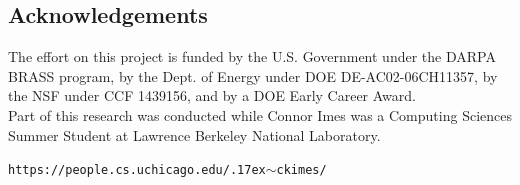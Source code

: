 \documentclass[a0,portrait]{a0poster}
\renewcommand{\small}{\fontsize{24.88}{30}\selectfont}
\begin{document}
\begin{multicols}{2}

%


\section*{Acknowledgements}

\small
The effort on this project is funded by the U.S. Government under the DARPA BRASS program, by the Dept. of Energy under DOE DE-AC02-06CH11357, by the NSF under CCF 1439156, and by a DOE Early Career Award.\\
Part of this research was conducted while Connor Imes was a Computing Sciences Summer Student at Lawrence Berkeley National Laboratory.


\end{multicols}

\begin{center}
\vspace{0.5cm}
\Large \texttt{https://people.cs.uchicago.edu/{\raise.17ex\hbox{$\scriptstyle\mathtt{\sim}$}}ckimes/}
\end{center}
\end{document}
